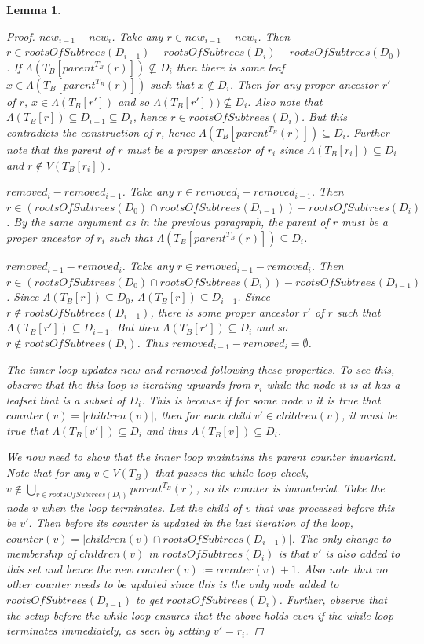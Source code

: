 \documentclass{article}
\newcommand{\leafset}{\Lambda}
\newtheorem{computerootsofsubtreescorrectness}[incompatibility]{Lemma}
\begin{document}
\begin{computerootsofsubtreescorrectness}
\begin{proof}
            \textit{$new_{i-1} - new_i$.} Take any $r \in new_{i-1} - new_i$. Then $r \in rootsOfSubtrees(D_{i-1}) - rootsOfSubtrees(D_i) - rootsOfSubtrees(D_0)$. If $\leafset(T_B[parent^{T_B}(r)]) \not\subseteq D_i$ then there is some leaf $x \in \leafset(T_B[parent^{T_B}(r)])$ such that $x \not\in D_i$. Then for any proper ancestor $r'$ of $r$, $x \in \leafset(T_B[r'])$ and so $\leafset(T_B[r'])) \not\subseteq D_i$. Also note that $\leafset(T_B[r]) \subseteq D_{i-1} \subseteq D_i$, hence $r \in rootsOfSubtrees(D_i)$. But this contradicts the construction of $r$, hence $\leafset(T_B[parent^{T_B}(r)]) \subseteq D_i$. Further note that the parent of $r$ must be a proper ancestor of $r_i$ since $\leafset(T_B[r_i]) \subseteq D_i$ and $r \not\in V(T_B[r_i])$.

            \textit{$removed_i - removed_{i-1}$.} Take any $r \in removed_i - removed_{i-1}$. Then $r \in (rootsOfSubtrees(D_0) \cap rootsOfSubtrees(D_{i-1})) - rootsOfSubtrees(D_i)$. By the same argument as in the previous paragraph, the parent of $r$ must be a proper ancestor of $r_i$ such that $\leafset(T_B[parent^{T_B}(r)]) \subseteq D_i$.

            \textit{$removed_{i-1} - removed_i$.} Take any $r \in removed_{i-1} - removed_i$. Then $r \in (rootsOfSubtrees(D_0) \cap rootsOfSubtrees(D_i)) - rootsOfSubtrees(D_{i-1})$. Since $\leafset(T_B[r]) \subseteq D_0$, $\leafset(T_B[r]) \subseteq D_{i-1}$. Since $r \not\in rootsOfSubtrees(D_{i-1})$, there is some proper ancestor $r'$ of $r$ such that $\leafset(T_B[r']) \subseteq D_{i-1}$. But then $\leafset(T_B[r']) \subseteq D_i$ and so $r \not\in rootsOfSubtrees(D_i)$. Thus $removed_{i-1} - removed_i = \emptyset$.

            The inner loop updates $new$ and $removed$ following these properties. To see this, observe that the this loop is iterating upwards from $r_i$ while the node it is at has a leafset that is a subset of $D_i$. This is because if for some node $v$ it is true that $counter(v) = |children(v)|$, then for each child $v' \in children(v)$, it must be true that $\leafset(T_B[v']) \subseteq D_i$ and thus $\leafset(T_B[v]) \subseteq D_i$.

            We now need to show that the inner loop maintains the parent counter invariant. Note that for any $v \in V(T_B)$ that passes the while loop check, $v \not\in \bigcup_{r \in rootsOfSubtrees(D_i)} parent^{T_B}(r)$, so its counter is immaterial. Take the node $v$ when the loop terminates. Let the child of $v$ that was processed before this be $v'$. Then before its counter is updated in the last iteration of the loop, $counter(v) = |children(v) \cap rootsOfSubtrees(D_{i-1})|$. The only change to membership of $children(v)$ in $rootsOfSubtrees(D_i)$ is that $v'$ is also added to this set and hence the new $counter(v) := counter(v) + 1$. Also note that no other counter needs to be updated since this is the only node added to $rootsOfSubtrees(D_{i-1})$ to get $rootsOfSubtrees(D_i)$. Further, observe that the setup before the while loop ensures that the above holds even if the while loop terminates immediately, as seen by setting $v' = r_i$.


\end{proof}
\end{computerootsofsubtreescorrectness}
\end{document}
